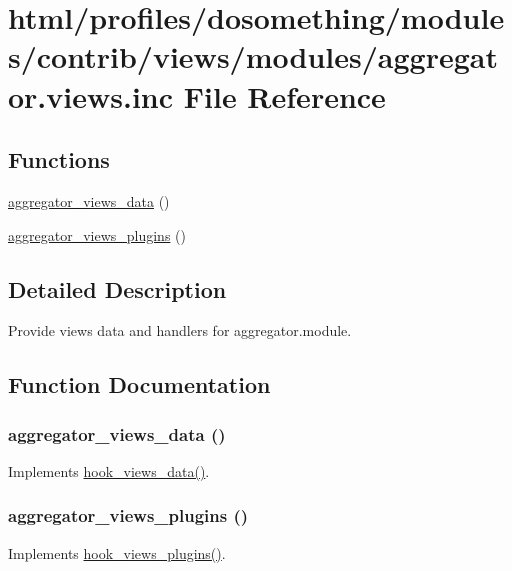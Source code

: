 \hypertarget{aggregator_8views_8inc}{
\section{html/profiles/dosomething/modules/contrib/views/modules/aggregator.views.inc File Reference}
\label{aggregator_8views_8inc}
}
\subsection*{Functions}
\begin{DoxyCompactItemize}
\item 
\hyperlink{aggregator_8views_8inc_a2a3f8960770694f1a6d3c0e2d7e24119}{aggregator\_\-views\_\-data} ()
\item 
\hyperlink{aggregator_8views_8inc_a1260b78865a34f57c44780293ea022b2}{aggregator\_\-views\_\-plugins} ()
\end{DoxyCompactItemize}


\subsection{Detailed Description}
Provide views data and handlers for aggregator.module. 

\subsection{Function Documentation}
\hypertarget{aggregator_8views_8inc_a2a3f8960770694f1a6d3c0e2d7e24119}{
\subsubsection[{aggregator\_\-views\_\-data}]{\setlength{\rightskip}{0pt plus 5cm}aggregator\_\-views\_\-data ()}}
\label{aggregator_8views_8inc_a2a3f8960770694f1a6d3c0e2d7e24119}
Implements \hyperlink{group__views__hooks_ga227057901681e4a33e33c199c7a8c989}{hook\_\-views\_\-data()}. \hypertarget{aggregator_8views_8inc_a1260b78865a34f57c44780293ea022b2}{
\subsubsection[{aggregator\_\-views\_\-plugins}]{\setlength{\rightskip}{0pt plus 5cm}aggregator\_\-views\_\-plugins ()}}
\label{aggregator_8views_8inc_a1260b78865a34f57c44780293ea022b2}
Implements \hyperlink{group__views__hooks_ga23f6e9972b2ed84fc54b7ff63f44477d}{hook\_\-views\_\-plugins()}. 